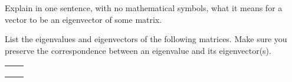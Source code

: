 \documentclass[12pt,twoside]{exam}
\begin{document}
\begin{questions}

    \question Explain in one sentence, with no mathematical symbols, what
    it means for a vector to be an eigenvector of some matrix.

    \question List the eigenvalues and eigenvectors of the following
    matrices. Make sure you preserve the correspondence between
    an eigenvalue and its eigenvector(s).

    \begin{parts}
        \begin{tabularx}{\linewidth}{XX}
            \part $\begin{pmatrix}
                1 & 2 \\ 0 & -3 
            \end{pmatrix}$ &
            \part $\begin{pmatrix}
                2 & 0 \\ 0 & -1
            \end{pmatrix}$ \\[1.0in]
            \part $\begin{pmatrix}
                2 & 3 \\ 3 & -6          
            \end{pmatrix}$ &
            \part $\begin{pmatrix}
                -6 & 2 \\ 3 & -1
            \end{pmatrix}$ \\[1.0in]
            \part $\begin{pmatrix}
                1 & -2 & 1 \\
                0 & 0 & 0 \\
                0 & 1 & 1        
            \end{pmatrix}$ &

\end{tabularx}
\end{parts}
\end{questions}
\end{document}
